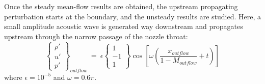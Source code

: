 \documentclass[conf]{new-aiaa}
\begin{document}
Once the steady mean-flow results are obtained, the upstream propagating perturbation starts at the boundary, and the unsteady results are studied.  
Here, a small amplitude acoustic wave is generated way downstream and propagates upstream through the narrow passage of the nozzle throat:
\begin{equation*}
	\left\{
	\begin{matrix}
		{\rho}' \\
		{u}' \\
		{p}'
	\end{matrix}
	\right\}_{outflow}~=~
\epsilon
	\left\{
	\begin{matrix}
		1 \\
		-1 \\
		1
	\end{matrix}
	\right\}\cos\left[\omega\left(\frac{x_{outflow}}{1-M_{outflow}}+t\right)\right]
\end{equation*}
where $\epsilon=10^{-5}$ and $\omega=0.6\pi$. 

%
\end{document}
